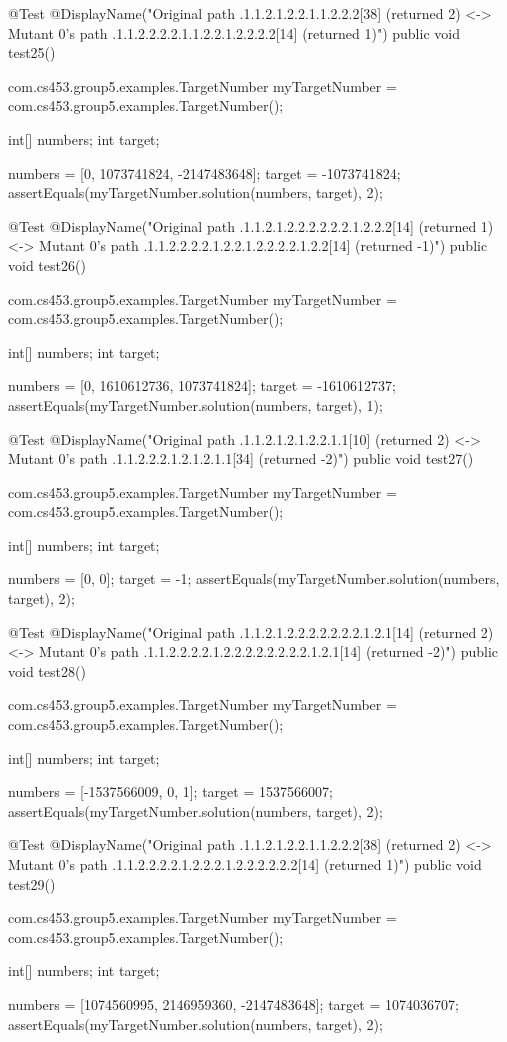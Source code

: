 @Test
@DisplayName("Original path .1.1.2.1.2.2.1.1.2.2.2[38] (returned 2) <-> Mutant 0's path .1.1.2.2.2.2.1.1.2.2.1.2.2.2.2[14] (returned 1)")
public void test25() {
    com.cs453.group5.examples.TargetNumber myTargetNumber = com.cs453.group5.examples.TargetNumber();

    int[] numbers;
    int target;

    numbers = [0, 1073741824, -2147483648];
    target = -1073741824;
    assertEquals(myTargetNumber.solution(numbers, target), 2);
}

@Test
@DisplayName("Original path .1.1.2.1.2.2.2.2.2.2.1.2.2.2[14] (returned 1) <-> Mutant 0's path .1.1.2.2.2.2.1.2.2.1.2.2.2.2.1.2.2[14] (returned -1)")
public void test26() {
    com.cs453.group5.examples.TargetNumber myTargetNumber = com.cs453.group5.examples.TargetNumber();

    int[] numbers;
    int target;

    numbers = [0, 1610612736, 1073741824];
    target = -1610612737;
    assertEquals(myTargetNumber.solution(numbers, target), 1);
}

@Test
@DisplayName("Original path .1.1.2.1.2.1.2.2.1.1[10] (returned 2) <-> Mutant 0's path .1.1.2.2.2.1.2.1.2.1.1[34] (returned -2)")
public void test27() {
    com.cs453.group5.examples.TargetNumber myTargetNumber = com.cs453.group5.examples.TargetNumber();

    int[] numbers;
    int target;

    numbers = [0, 0];
    target = -1;
    assertEquals(myTargetNumber.solution(numbers, target), 2);
}

@Test
@DisplayName("Original path .1.1.2.1.2.2.2.2.2.2.2.1.2.1[14] (returned 2) <-> Mutant 0's path .1.1.2.2.2.2.1.2.2.2.2.2.2.2.2.1.2.1[14] (returned -2)")
public void test28() {
    com.cs453.group5.examples.TargetNumber myTargetNumber = com.cs453.group5.examples.TargetNumber();

    int[] numbers;
    int target;

    numbers = [-1537566009, 0, 1];
    target = 1537566007;
    assertEquals(myTargetNumber.solution(numbers, target), 2);
}

@Test
@DisplayName("Original path .1.1.2.1.2.2.1.1.2.2.2[38] (returned 2) <-> Mutant 0's path .1.1.2.2.2.2.1.2.2.2.1.2.2.2.2.2.2[14] (returned 1)")
public void test29() {
    com.cs453.group5.examples.TargetNumber myTargetNumber = com.cs453.group5.examples.TargetNumber();

    int[] numbers;
    int target;

    numbers = [1074560995, 2146959360, -2147483648];
    target = 1074036707;
    assertEquals(myTargetNumber.solution(numbers, target), 2);
}

